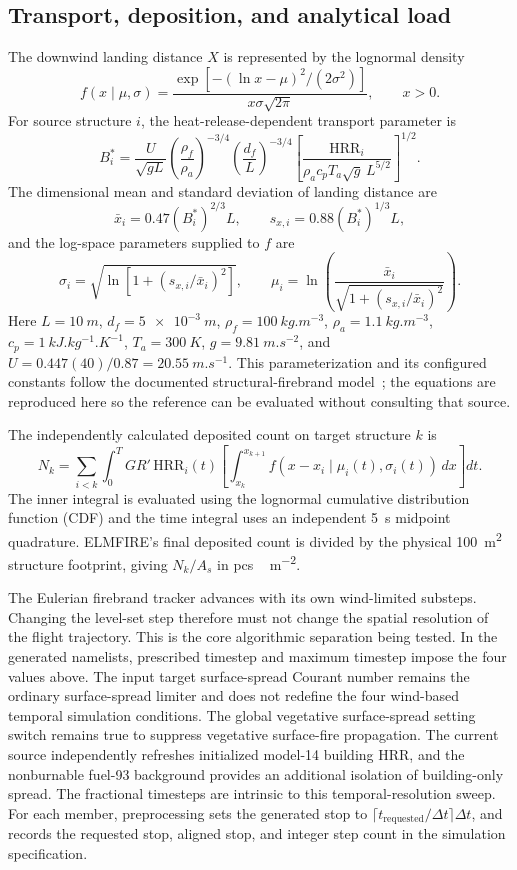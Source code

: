 \subsection{Transport, deposition, and analytical load}

The downwind landing distance \(X\) is represented by the lognormal density
\[
 f(x\mid\mu,\sigma)=
 \frac{\exp[-(\ln x-\mu)^2/(2\sigma^2)]}
      {x\sigma\sqrt{2\pi}},\qquad x>0.
\]
For source structure \(i\), the heat-release-dependent transport parameter is
\[
 B_i^*=\frac{U}{\sqrt{gL}}
 \left(\frac{\rho_f}{\rho_a}\right)^{-3/4}
 \left(\frac{d_f}{L}\right)^{-3/4}
 \left[
 \frac{\mathrm{HRR}_i}
 {\rho_a c_p T_a\sqrt{g}\,L^{5/2}}
 \right]^{1/2}.
\]
The dimensional mean and standard deviation of landing distance are
\[
 \bar x_i=0.47(B_i^*)^{2/3}L,\qquad
 s_{x,i}=0.88(B_i^*)^{1/3}L,
\]
and the log-space parameters supplied to \(f\) are
\[
 \sigma_i=\sqrt{\ln\!\left[1+(s_{x,i}/\bar x_i)^2\right]},
 \qquad
 \mu_i=\ln\!\left(
 \frac{\bar x_i}{\sqrt{1+(s_{x,i}/\bar x_i)^2}}
 \right).
\]
Here \(L=\SI{10}{m}\), \(d_f=\SI{5e-3}{m}\),
\(\rho_f=\SI{100}{kg.m^{-3}}\), \(\rho_a=\SI{1.1}{kg.m^{-3}}\),
\(c_p=\SI{1}{kJ.kg^{-1}.K^{-1}}\), \(T_a=\SI{300}{K}\),
\(g=\SI{9.81}{m.s^{-2}}\), and
\(U=0.447(40)/0.87=\SI{20.55}{m.s^{-1}}\). This parameterization and its
configured constants follow the documented structural-firebrand
model~\cite{Qin2025}; the equations are reproduced here so the reference can
be evaluated without consulting that source.

The independently calculated deposited count on target structure \(k\) is
\[
N_k=\sum_{i<k}\int_0^T GR'\,\mathrm{HRR}_i(t)
\left[\int_{x_k}^{x_{k+1}}
 f\!\left(x-x_i\mid\mu_i(t),\sigma_i(t)\right)\,dx\right]dt .
\]
The inner integral is evaluated using the lognormal cumulative distribution function (CDF) and the time integral
uses an independent \SI{5}{s} midpoint quadrature. ELMFIRE's final deposited
count is divided by the physical \SI{100}{m^2} structure footprint, giving
\(N_k/A_s\) in \si{pcs\,m^{-2}}.

The Eulerian firebrand tracker advances with its own wind-limited substeps.
Changing the level-set step therefore must not change the spatial resolution of
the flight trajectory. This is the core algorithmic separation being tested.
In the generated namelists, prescribed timestep and
maximum timestep impose the four values above. The input
target surface-spread Courant number remains the ordinary surface-spread limiter and does not
redefine the four wind-based temporal simulation conditions.  The global vegetative surface-spread setting switch remains true to suppress vegetative surface-fire propagation.  The current source independently refreshes initialized model-14 building HRR, and the nonburnable fuel-93 background provides an additional isolation of building-only spread.
The fractional timesteps are intrinsic to this temporal-resolution sweep.  For
each member, preprocessing sets the generated stop to
\(\lceil t_{\mathrm{requested}}/\Delta t\rceil\Delta t\), and records the
requested stop, aligned stop, and integer step count in the simulation specification.

